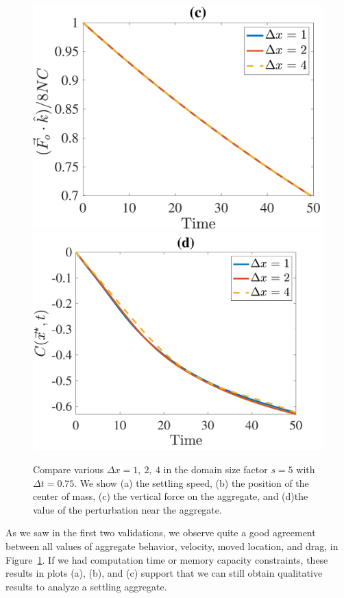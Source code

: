 \begin{figure}[ht]
\begin{center}
		\includegraphics[scale=0.35]{./figures/fig_NC10_dx_Fo3_all}
		\includegraphics[scale=0.35]{./figures/fig_NC10_dx_C_star_interp3}
	\caption{Compare various $\Delta x = 1, \ 2, \ 4$ in the domain size factor $s = 5$ with $\Delta t = 0.75$. We show (a) the settling speed, (b) the position of the center of mass, (c) the vertical force on the aggregate, and (d)the value of the perturbation near the aggregate.}
	\label{fig_NC10_compare_dx}
\end{center}
\end{figure}
As we saw in the first two validations, we observe quite a good agreement between all values of aggregate behavior, velocity, moved location, and drag, in Figure~\ref{fig_NC10_compare_dx}. If we had computation time or memory capacity constraints, these results in plots (a), (b), and (c) support that we can still obtain qualitative results to analyze a settling aggregate. 
